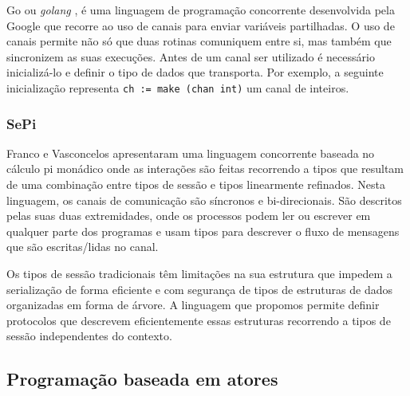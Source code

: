 Go ou \textit{golang} \cite{ref-go}, é uma linguagem de programação concorrente desenvolvida pela Google que recorre ao uso de canais para enviar variáveis partilhadas. O uso de canais permite não só que duas rotinas comuniquem entre si, mas também que sincronizem as suas execuções. Antes de um canal ser utilizado é necessário inicializá-lo e definir o tipo de dados que transporta. Por exemplo, a seguinte inicialização representa \lstinline"ch := make (chan int)" um canal de inteiros.

\subsubsection{SePi}
\label{sec:sepi}
\lstset{language=Sepi}
Franco e Vasconcelos \cite{ref-sepi} apresentaram uma linguagem concorrente baseada no cálculo pi monádico onde as interações são feitas recorrendo a tipos que resultam de uma combinação entre tipos de sessão e tipos linearmente refinados.
Nesta linguagem, os canais de comunicação são síncronos e bi-direcionais. São descritos pelas suas duas extremidades, onde os processos podem ler ou escrever em qualquer parte dos programas e usam tipos para descrever o fluxo de mensagens que são escritas/lidas no canal.

 Os tipos de sessão tradicionais têm limitações na sua estrutura que impedem a serialização de forma eficiente e com segurança de tipos de estruturas de dados organizadas em forma de árvore. A linguagem que propomos permite definir protocolos que descrevem eficientemente essas estruturas recorrendo a tipos de sessão independentes do contexto.


\subsection{Programação baseada em atores}
\label{sec:actors}

